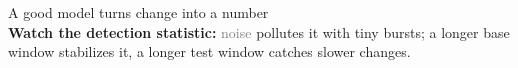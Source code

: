 \documentclass[aspectratio=169,10pt]{beamer}
\begin{document}
\begin{frame}{A good model turns change into a number}
  \centering
  \\
  \vspace{0.2em}
  {\footnotesize \textbf{Watch the detection statistic:} \textcolor{gray}{noise} pollutes it with tiny bursts; a longer
  \textcolor{tblue}{base window} stabilizes it, a longer \textcolor{tgreen}{test window} catches slower changes.}
\end{frame}
\end{document}
